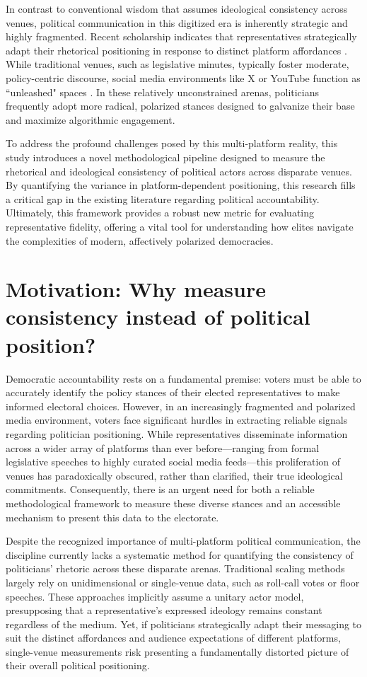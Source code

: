 \documentclass[11pt,letterpaper]{article}
\theoremstyle{plain}
\begin{document}
In contrast to conventional wisdom that assumes ideological consistency across venues, political communication in this digitized era is inherently strategic and highly fragmented. Recent scholarship indicates that representatives strategically adapt their rhetorical positioning in response to distinct platform affordances \citep{blum2023conditional, green2024cross}. While traditional venues, such as legislative minutes, typically foster moderate, policy-centric discourse, social media environments like X or YouTube function as ``unleashed" spaces \citep{castanhosilva2022politicians}. In these relatively unconstrained arenas, politicians frequently adopt more radical, polarized stances designed to galvanize their base and maximize algorithmic engagement.

To address the profound challenges posed by this multi-platform reality, this study introduces a novel methodological pipeline designed to measure the rhetorical and ideological consistency of political actors across disparate venues. By quantifying the variance in platform-dependent positioning, this research fills a critical gap in the existing literature regarding political accountability. Ultimately, this framework provides a robust new metric for evaluating representative fidelity, offering a vital tool for understanding how elites navigate the complexities of modern, affectively polarized democracies.

\section{Motivation: Why measure consistency instead of political position?}
Democratic accountability rests on a fundamental premise: voters must be able to accurately identify the policy stances of their elected representatives to make informed electoral choices. However, in an increasingly fragmented and polarized media environment, voters face significant hurdles in extracting reliable signals regarding politician positioning. While representatives disseminate information across a wider array of platforms than ever before—ranging from formal legislative speeches to highly curated social media feeds—this proliferation of venues has paradoxically obscured, rather than clarified, their true ideological commitments. Consequently, there is an urgent need for both a reliable methodological framework to measure these diverse stances and an accessible mechanism to present this data to the electorate.

Despite the recognized importance of multi-platform political communication, the discipline currently lacks a systematic method for quantifying the consistency of politicians' rhetoric across these disparate arenas. Traditional scaling methods largely rely on unidimensional or single-venue data, such as roll-call votes or floor speeches. These approaches implicitly assume a unitary actor model, presupposing that a representative's expressed ideology remains constant regardless of the medium. Yet, if politicians strategically adapt their messaging to suit the distinct affordances and audience expectations of different platforms, single-venue measurements risk presenting a fundamentally distorted picture of their overall political positioning.
\end{document}
